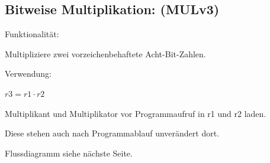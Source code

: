 \documentclass[fleqn, a4paper, 11pt]{article}       %
\begin{document}
\subsection{Bitweise Multiplikation: (MULv3)\label{A.MULv3}}
Funktionalität:

Multipliziere zwei vorzeichenbehaftete Acht-Bit-Zahlen.
\vspace{0.25cm}

\noindent Verwendung:
\begin{compactitem}
	\item $r3 = r1 \cdot r2$
	\item Multiplikant und Multiplikator vor Programmaufruf in r1 und r2 laden.
	\item Diese stehen auch nach Programmablauf unverändert                dort.
\end{compactitem}
\vspace{0.25cm}
\noindent Flussdiagramm siehe nächste Seite.






\thispagestyle{empty}






\newpage

\printbibliography  %
\end{document}

